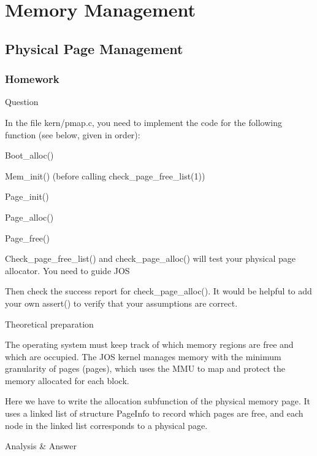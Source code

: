 
\section{Memory Management}
\subsection{Physical Page Management}
\subsubsection{Homework }
\begin{flushleft}
{\Large Question}
\end{flushleft}

In the file kern/pmap.c, you need to implement the code for the following function (see below, given in order):

Boot\_alloc()

Mem\_init() (before calling check\_page\_free\_list(1))

Page\_init()

Page\_alloc()

Page\_free()

Check\_page\_free\_list() and check\_page\_alloc() will test your physical page allocator. You need to guide JOS

Then check the success report for check\_page\_alloc(). It would be helpful to add your own assert() to verify that your assumptions are correct.
\begin{flushleft}
{\Large Theoretical preparation}
\end{flushleft}


The operating system must keep track of which memory regions are free and which are occupied. The JOS kernel manages memory with the minimum granularity of pages (pages), which uses the MMU to map and protect the memory allocated for each block.

Here we have to write the allocation subfunction of the physical memory page. It uses a linked list of structure PageInfo to record which pages are free, and each node in the linked list corresponds to a physical page.

\begin{flushleft}
{\Large Analysis \& Answer}
\end{flushleft}

